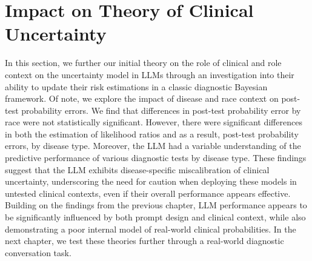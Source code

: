 \section{Impact on Theory of Clinical Uncertainty}

In this section, we further our initial theory on the role of clinical and role context on the uncertainty model in LLMs through an investigation into their ability to update their risk estimations in a classic diagnostic Bayesian framework. Of note, we explore the impact of disease and race context on post-test probability errors. We find that differences in post-test probability error by race were not statistically significant. However, there were significant differences in both the estimation of likelihood ratios and as a result, post-test probability errors, by disease type. Moreover, the LLM had a variable understanding of the predictive performance of various diagnostic tests by disease type. These findings suggest that the LLM exhibits disease-specific miscalibration of clinical uncertainty, underscoring the need for caution when deploying these models in untested clinical contexts, even if their overall performance appears effective. Building on the findings from the previous chapter, LLM performance appears to be significantly influenced by both prompt design and clinical context, while also demonstrating a poor internal model of real-world clinical probabilities. In the next chapter, we test these theories further through a real-world diagnostic conversation task.